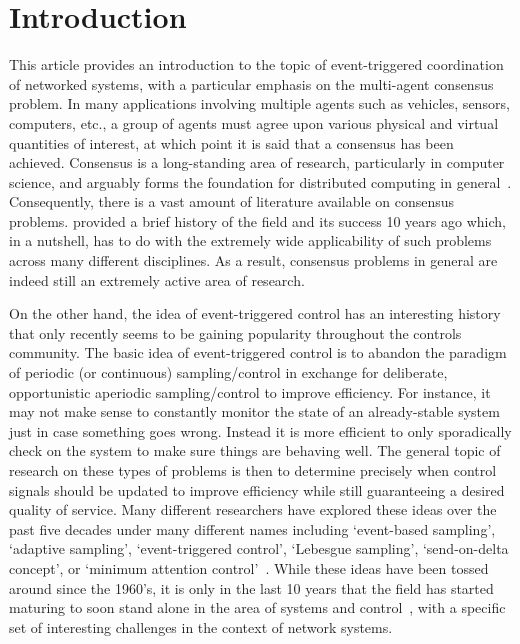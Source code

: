 \documentclass{autart}
\begin{document}
\section{Introduction} \label{sec:intro}

This article provides an introduction to the topic of event-triggered
coordination of networked systems, with a particular emphasis on the
multi-agent consensus problem. In many applications involving multiple
agents such as vehicles, sensors, computers, etc., a group of agents
must agree upon various physical and virtual quantities of interest,
at which point it is said that a consensus has been
achieved. Consensus is a long-standing area of research, particularly
in computer science, and arguably forms the foundation for distributed
computing in
general~\citep{ROS-RMM:03c,WR-RWB:08,NAL:97,WR-RWB-EMA:07}. Consequently,
there is a vast amount of literature available on consensus
problems. \cite{ROS-JAF-RMM:07} provided a brief history of the field
and its success 10 years ago which, in a nutshell, has to do with the
extremely wide applicability of such problems across many different
disciplines. As a result, consensus problems in general are indeed
still an extremely active area of research.

On the other hand, the idea of event-triggered control has an
interesting history that only recently seems to be gaining popularity
throughout the controls community.  The basic idea of event-triggered
control is to abandon the paradigm of periodic (or continuous)
sampling/control in exchange for deliberate, opportunistic aperiodic
sampling/control to improve efficiency. For instance, it may not make
sense to constantly monitor the state of an already-stable system just
in case something goes wrong. Instead it is more efficient to only
sporadically check on the system to make sure things are behaving
well. The general topic of research on these types of problems is then
to determine precisely when control signals should be updated to
improve efficiency while still guaranteeing a desired quality of
service. Many different researchers have explored these ideas over the
past five decades under many different names including `event-based
sampling', `adaptive sampling', `event-triggered control', `Lebesgue
sampling', `send-on-delta concept', or `minimum attention
control'~\citep{KJA-BMB:99,KJA-BMB:02,KEA:99,JS-WPMHH-PB:05,RWB:97,MM:06,WPMHH-JHS-PPJB:08,PT:07,PGO-JRM-DMT:02,JM-WM:67,AS-CP-NM:14}. While
these ideas have been tossed around since the 1960's, it is only in
the last 10 years that the field has started maturing to soon stand
alone in the area of systems and
control~\citep{WPMHH-KHJ-PT:12,LH-CF-HO-AS-EF-JR-SIN:17}, with a
specific set of interesting challenges in the context of network
systems.
\end{document}
